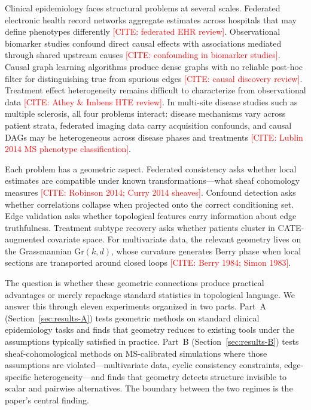 \documentclass[11pt]{article}
\newcommand{\Gr}{\mathrm{Gr}}
\newcommand{\misscite}[1]{\textcolor{red}{[CITE: #1]}}
\begin{document}
Clinical epidemiology faces structural problems at several scales.
Federated electronic health record networks aggregate estimates across hospitals that may define phenotypes differently \misscite{federated EHR review}.
Observational biomarker studies confound direct causal effects with associations mediated through shared upstream causes \misscite{confounding in biomarker studies}.
Causal graph learning algorithms produce dense graphs with no reliable post-hoc filter for distinguishing true from spurious edges \misscite{causal discovery review}.
Treatment effect heterogeneity remains difficult to characterize from observational data \misscite{Athey \& Imbens HTE review}.
In multi-site disease studies such as multiple sclerosis, all four problems interact: disease mechanisms vary across patient strata, federated imaging data carry acquisition confounds, and causal DAGs may be heterogeneous across disease phases and treatments \misscite{Lublin 2014 MS phenotype classification}.

Each problem has a geometric aspect.
Federated consistency asks whether local estimates are compatible under known transformations---what sheaf cohomology measures \misscite{Robinson 2014; Curry 2014 sheaves}.
Confound detection asks whether correlations collapse when projected onto the correct conditioning set.
Edge validation asks whether topological features carry information about edge truthfulness.
Treatment subtype recovery asks whether patients cluster in CATE-augmented covariate space.
For multivariate data, the relevant geometry lives on the Grassmannian $\Gr(k,d)$, whose curvature generates Berry phase when local sections are transported around closed loops \misscite{Berry 1984; Simon 1983}.

The question is whether these geometric connections produce practical advantages or merely repackage standard statistics in topological language.
We answer this through eleven experiments organized in two parts.
Part~A (Section~\ref{sec:results-A}) tests geometric methods on standard clinical epidemiology tasks and finds that geometry reduces to existing tools under the assumptions typically satisfied in practice.
Part~B (Section~\ref{sec:results-B}) tests sheaf-cohomological methods on MS-calibrated simulations where those assumptions are violated---multivariate data, cyclic consistency constraints, edge-specific heterogeneity---and finds that geometry detects structure invisible to scalar and pairwise alternatives.
The boundary between the two regimes is the paper's central finding.
\end{document}
